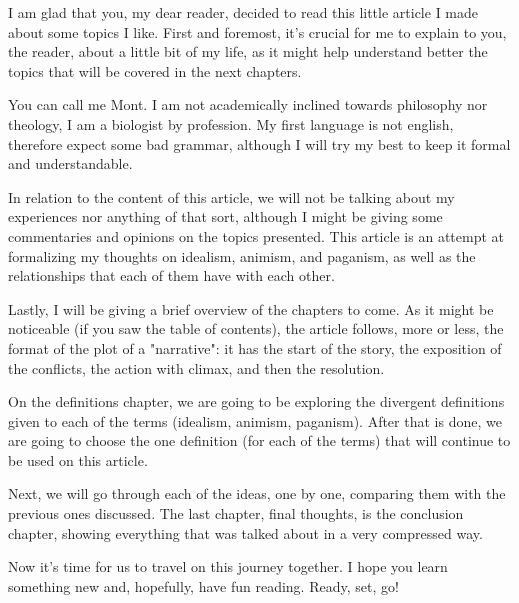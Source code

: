 I am glad that you, my dear reader, decided to read this little article I made about some topics I like.
First and foremost, it's crucial for me to explain to you, the reader, about a little bit
of my life, as it might help understand better the topics that will be covered in the next
chapters.

You can call me Mont. I am not academically inclined towards philosophy nor theology, I am a biologist
by profession. My first language is not english, therefore expect some bad grammar, although I will
try my best to keep it formal and understandable.

In relation to the content of this article, we will not be talking about my experiences nor anything of
that sort, although I might be giving some commentaries and opinions on the topics presented. This
article is an attempt at formalizing my thoughts on idealism, animism, and paganism, as well as the
relationships that each of them have with each other.

Lastly, I will be giving a brief overview of the chapters to come. As it might be noticeable (if you saw
the table of contents), the article follows, more or less, the format of the plot of a "narrative": it has
the start of the story, the exposition of the conflicts, the action with climax, and then the resolution.

On the definitions chapter, we are going to be exploring the divergent definitions given to each of
the terms (idealism, animism, paganism). After that is done, we are going to choose the one definition
(for each of the terms) that will continue to be used on this article.

Next, we will go through each of the ideas, one by one, comparing them with the previous ones discussed.
The last chapter, final thoughts, is the conclusion chapter, showing everything that was talked
about in a very compressed way.

Now it's time for us to travel on this journey together. I hope you learn something new and, hopefully,
have fun reading. Ready, set, go!